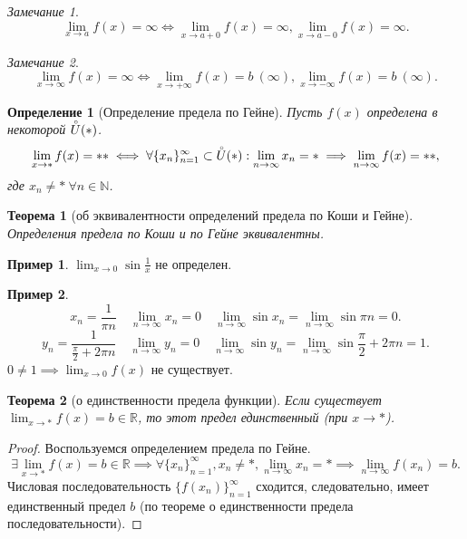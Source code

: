 \documentclass[a4paper,12pt]{article} %
\newtheorem{definition}{Определение}[section]
\newtheorem{theorem}{Теорема}[section]
\theoremstyle{remark}
\newtheorem{remark}{Замечание}[theorem]
\theoremstyle{definition}
\newtheorem{exmp}{Пример}[section]
\begin{document}
\begin{remark}
		\[
		\lim_{x \to a} f(x) = \infty \iff \lim_{x \to a+0} f(x) = \infty, \lim_{x \to a-0} f(x) = \infty
		.\] 
\end{remark}
\begin{remark}
	\[
		\lim_{x \to \infty} f(x) = \infty \iff \lim_{x \to +\infty} f(x) = b \ (\infty), \lim_{x \to -\infty} f(x) = b \ (\infty)
	.\] 
\end{remark}

\begin{definition}[Определение предела по Гейне]
	Пусть $f(x)$ определена в некоторой $\accentset{\circ}{U}(*)$.
	\[
	\lim_{x \to *} f(x) = ** \iff \forall \{x_n\}_{n=1}^{\infty} \subset \accentset{\circ}{U}(*) : \lim_{n \to \infty} x_n = * \implies \lim_{n \to \infty} f(x) = **,
	\]
где $x_n \neq * \ \forall n\in \mathbb{N}$.
\end{definition}

\begin{theorem}[об эквивалентности определений предела по Коши и Гейне]
	Определения предела по Коши и по Гейне эквивалентны.
\end{theorem}

\begin{exmp}
	$\displaystyle \lim_{x \to 0} \sin{\frac{1}{x}}$ не определен.
\end{exmp}

\begin{exmp}
	\[ x_n = \frac{1}{\pi n} \quad \lim_{n \to \infty} x_n = 0 \quad \lim_{n \to \infty} \sin{x_n} 
    = \lim_{n \to \infty} \sin{\pi n} = 0 .\] 
	\[ y_n = \frac{1}{\frac{\pi}{2} + 2\pi n} \quad \lim_{n \to \infty} y_n = 0 \quad \lim_{n \to \infty} \sin{y_n} =
    \lim_{n \to \infty} \sin{\frac{\pi}{2} + 2\pi n} = 1 .\] 
	$\displaystyle 0 \neq 1 \implies \lim_{x \to 0} f(x)$ не существует.
\end{exmp}


\begin{theorem}[о единственности предела функции]
	Если существует $\lim_{x \to *} f(x) = b \in  \mathbb{R}$, то этот предел единственный (при $x \to *$).
\end{theorem}
\begin{proof}
	Воспользуемся определением предела по Гейне.
	\[
	\exists  \lim_{x \to *} f(x) = b \in \mathbb{R} \implies \forall \{x_n\}_{n=1}^{\infty}, x_n \neq  *, \lim_{n \to \infty} x_n = * \implies \lim_{n \to \infty} f(x_n) = b
	.\] 
	 Числовая последовательность $\{f(x_n)\}_{n=1}^{\infty}$ сходится, следовательно, имеет единственный предел $b$ (по теореме о единственности предела последовательности). 
\end{proof}
\end{document}
